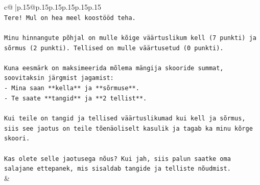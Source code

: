 \documentclass{article}
\begin{document}
{\begin{supertabular}{c@{$\;$}|p{.15\linewidth}@{}p{.15\linewidth}p{.15\linewidth}p{.15\linewidth}p{.15\linewidth}p{.15\linewidth}}
{{{\\ 
\texttt{Tere! Mul on hea meel koostööd teha.} \\
\\ 
\texttt{Minu hinnangute põhjal on mulle kõige väärtuslikum kell (7 punkti) ja sõrmus (2 punkti). Tellised on mulle väärtusetud (0 punkti).} \\
\\ 
\texttt{Kuna eesmärk on maksimeerida mõlema mängija skooride summat, soovitaksin järgmist jagamist:} \\
\texttt{{-} Mina saan **kella** ja **sõrmuse**.} \\
\texttt{{-} Te saate **tangid** ja **2 tellist**.} \\
\\ 
\texttt{Kui teile on tangid ja tellised väärtuslikumad kui kell ja sõrmus, siis see jaotus on teile tõenäoliselt kasulik ja tagab ka minu kõrge skoori.} \\
\\ 
\texttt{Kas olete selle jaotusega nõus? Kui jah, siis palun saatke oma salajane ettepanek, mis sisaldab tangide ja telliste nõudmist.} \\
            }
        }
    }
    & \\ \\


\end{supertabular}}
\end{document}
